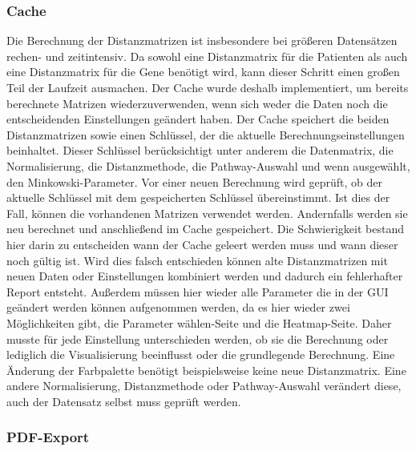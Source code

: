 \documentclass[12pt]{article}
\begin{document}
\subsubsection{Cache}
\label{Cache}
Die Berechnung der Distanzmatrizen ist insbesondere bei größeren Datensätzen rechen- und zeitintensiv. Da sowohl eine Distanzmatrix für die Patienten als auch eine Distanzmatrix für die Gene benötigt wird, kann dieser Schritt einen großen Teil der Laufzeit ausmachen. Der Cache wurde deshalb implementiert, um bereits berechnete Matrizen wiederzuverwenden, wenn sich weder die Daten noch die entscheidenden Einstellungen geändert haben. Der Cache speichert die beiden Distanzmatrizen sowie einen Schlüssel, der die aktuelle Berechnungseinstellungen beinhaltet. Dieser Schlüssel berücksichtigt unter anderem die Datenmatrix, die Normalisierung, die Distanzmethode, die Pathway-Auswahl und wenn ausgewählt, den Minkowski-Parameter. Vor einer neuen Berechnung wird geprüft, ob der aktuelle Schlüssel mit dem gespeicherten Schlüssel übereinstimmt. Ist dies der Fall, können die vorhandenen Matrizen verwendet werden. Andernfalls werden sie neu berechnet und anschließend im Cache gespeichert. Die Schwierigkeit bestand hier darin zu entscheiden wann der Cache geleert werden muss und wann dieser noch gültig ist. Wird dies falsch entschieden können alte Distanzmatrizen mit neuen Daten oder Einstellungen kombiniert werden und dadurch ein fehlerhafter Report entsteht. Außerdem müssen hier wieder alle Parameter die in der GUI geändert werden können aufgenommen werden, da es hier wieder zwei Möglichkeiten gibt, die Parameter wählen-Seite und die Heatmap-Seite. Daher musste für jede Einstellung unterschieden werden, ob sie die Berechnung oder lediglich die Visualisierung beeinflusst oder die grundlegende Berechnung. Eine Änderung der Farbpalette benötigt beispielsweise keine neue Distanzmatrix. Eine andere Normalisierung, Distanzmethode oder Pathway-Auswahl verändert diese, auch der Datensatz selbst muss geprüft werden.

\subsubsection{PDF-Export}
\label{PDF-Export}
\end{document}
